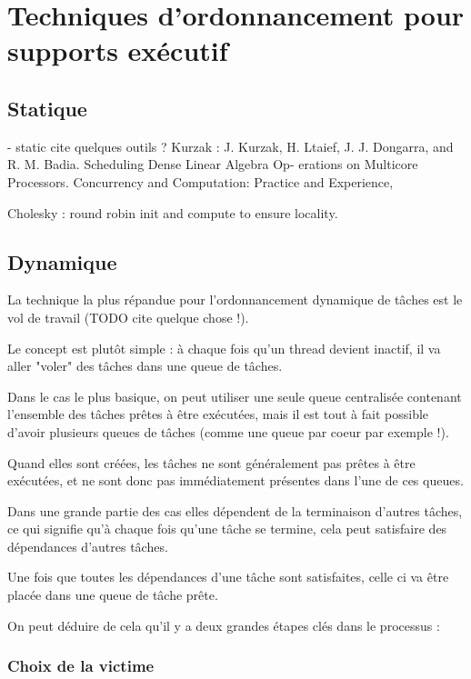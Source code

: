 \section{Techniques d'ordonnancement pour supports exécutif}\label{sec:context:runtimes}

\subsection{Statique}
 - static
 cite quelques outils ?
Kurzak : J. Kurzak, H. Ltaief, J. J. Dongarra, and R. M. Badia. Scheduling Dense Linear Algebra Op- erations on Multicore Processors. Concurrency and Computation: Practice and Experience,

Cholesky : round robin init and compute to ensure locality.

\subsection{Dynamique}

La technique la plus répandue pour l'ordonnancement dynamique de tâches est le vol de travail (TODO cite quelque chose !).

Le concept est plutôt simple : à chaque fois qu'un thread devient inactif, il va aller "voler" des tâches dans une queue de tâches.

Dans le cas le plus basique, on peut utiliser une seule queue centralisée contenant l'ensemble des tâches prêtes à être exécutées, mais il est tout à fait possible d'avoir plusieurs queues de tâches (comme une queue par coeur par exemple !).

Quand elles sont créées, les tâches ne sont généralement pas prêtes à être exécutées, et ne sont donc pas immédiatement présentes dans l'une de ces queues.

Dans une grande partie des cas elles dépendent de la terminaison d'autres tâches, ce qui signifie qu'à chaque fois qu'une tâche se termine, cela peut satisfaire des dépendances d'autres tâches.

Une fois que toutes les dépendances d'une tâche sont satisfaites, celle ci va être placée dans une queue de tâche prête.

On peut déduire de cela qu'il y a deux grandes étapes clés dans le processus :

\subsubsection{Choix de la victime}

